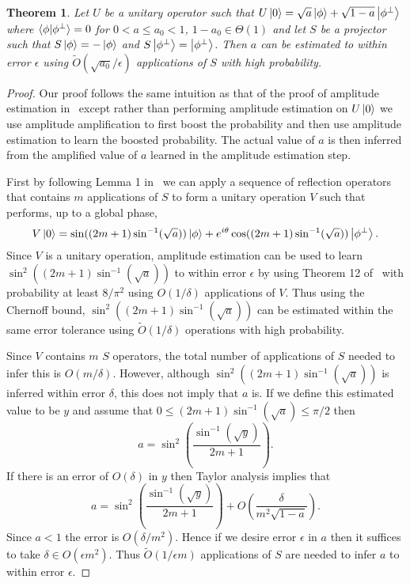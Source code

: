 \documentclass[aps,amsmath,onecolumn,amssymb,notitlepage]{revtex4-1}
\newtheorem{theorem}{Theorem}
\begin{document}
\begin{theorem}
Let $U$ be a unitary operator such that $U\left|0\right\rangle=\sqrt{a}\left|\phi\right\rangle + \sqrt{1-a}\left|\phi^\perp\right\rangle$ where $\langle\phi|\phi^\perp\rangle=0$ for $0<a\le a_0<1$, $1-a_0\in \Theta(1)$ and let $S$ be a projector such that $S\left|\phi\right\rangle=-\left|\phi\right\rangle$ and $S\left|\phi^\perp\right\rangle=\left|\phi^\perp\right\rangle$.  Then $a$ can be estimated to within error $\epsilon$ using $\tilde{O}(\sqrt{a_0}/\epsilon)$ applications of $S$ with high probability.\label{thm:priorAmpEst}
\end{theorem}
\begin{proof}
Our proof follows the same intuition as that of the proof of amplitude estimation in~\cite{BHM+02} except rather than performing amplitude estimation on $U\left|0\right\rangle$ we use amplitude amplification to first boost the probability and then use amplitude estimation to learn the boosted probability.  The actual value of $a$ is then inferred from the amplified value of $a$ learned in the amplitude estimation step.

First by following Lemma 1 in~\cite{BHM+02} we can apply a sequence of reflection operators that contains $m$ applications of $S$ to form a unitary operation $V$ such that performs, up to a global phase,
\begin{equation}
V\left|0\right\rangle = \sin((2m+1)\sin^{-1}(\sqrt{a}))\left|\phi\right\rangle + e^{i\theta}\cos((2m+1)\sin^{-1}(\sqrt{a}))\left|\phi^\perp\right\rangle.
\end{equation}
Since $V$ is a unitary operation, amplitude estimation can be used to learn $\sin^2((2m+1)\sin^{-1}(\sqrt{a}))$ to within error $\epsilon$ by using Theorem 12 of~\cite{BHM+02} with probability at least $8/\pi^2$ using $O(1/\delta)$ applications of $V$.  Thus using the Chernoff bound, $\sin^2((2m+1)\sin^{-1}(\sqrt{a}))$ can be estimated within the same error tolerance using $\tilde{O}(1/\delta)$ operations with high probability.

Since $V$ contains $m$ $S$ operators, the total number of applications of $S$ needed to infer this is $O(m/\delta)$.  However, although $\sin^2((2m+1)\sin^{-1}(\sqrt{a}))$ is inferred within error $\delta$, this does not imply that $a$ is.  If we define this estimated value to be $y$ and assume that $0\le (2m+1)\sin^{-1}(\sqrt{a}) \le \pi/2$ then
\begin{equation}
a = \sin^2\left(\frac{\sin^{-1}(\sqrt{y})}{2m+1}\right).\label{eq:aeq}
\end{equation}
If there is an error of $O(\delta)$ in $y$ then Taylor analysis implies that
\begin{equation}
a=\sin^2\left(\frac{\sin^{-1}(\sqrt{y})}{2m+1}\right) + O\left(\frac{\delta}{m^2\sqrt{1-a}} \right).
\end{equation}
Since $a<1$ the error is $O(\delta/m^2)$.  Hence if we desire error $\epsilon$ in $a$ then it suffices to take $\delta\in O(\epsilon m^2)$.  Thus $\tilde O(1/\epsilon m)$ applications of $S$ are needed to infer $a$ to within error $\epsilon$.


\end{proof}
\end{document}
